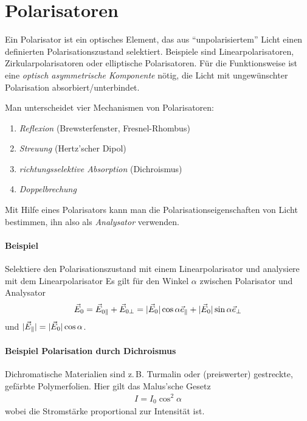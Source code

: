 \section{Polarisatoren}
Ein Polarisator ist ein optisches Element,
das aus \enquote{unpolarisiertem} Licht einen definierten
Polarisationszustand selektiert.
Beispiele sind Linearpolarisatoren, Zirkularpolarisatoren oder
elliptische Polarisatoren.
Für die Funktionsweise ist eine \emph{optisch asymmetrische
  Komponente} nötig,
die Licht mit ungewünschter Polarisation absorbiert/unterbindet.

Man unterscheidet vier Mechanismen von Polarisatoren:
\begin{enumerate}
\item \emph{Reflexion} (Brewsterfenster, Fresnel-Rhombus)
\item \emph{Streuung} (Hertz'scher Dipol)
\item \emph{richtungsselektive Absorption} (Dichroismus)
\item \emph{Doppelbrechung}
\end{enumerate}

Mit Hilfe eines Polarisators kann man die Polarisationseigenschaften
von Licht bestimmen, ihn also als \emph{Analysator}
verwenden.

\paragraph{Beispiel} Selektiere den Polarisationszustand mit einem
Linearpolarisator und analysiere mit dem Linearpolarisator
Es gilt für den Winkel $\alpha$ zwischen Polarisator und Analysator
\begin{gather*}
  \vec{E}_0 = \vec{E}_{0\parallel} + \vec{E}_{0\bot} 
  = |\vec{E}_0|\cos\alpha \vec{e}_\parallel
  + |\vec{E}_0|\sin\alpha \vec{e}_\bot
\end{gather*}
und $|\vec{E}_\parallel| = |\vec{E}_0|\cos\alpha$.

\paragraph{Beispiel Polarisation durch Dichroismus}
Dichromatische Materialien sind z.\,B. Turmalin oder (preiswerter)
gestreckte, gefärbte Polymerfolien.
Hier gilt das Malus'sche Gesetz
\begin{gather*}
  I=I_0\cos^2\alpha
\end{gather*}
wobei die Stromstärke proportional zur Intensität ist.


